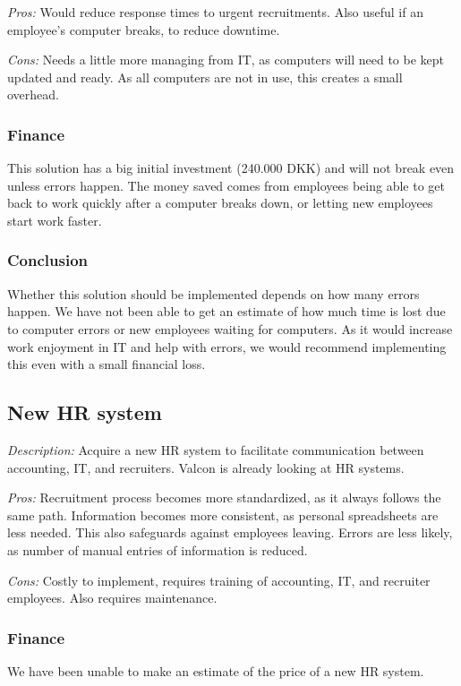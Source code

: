 \emph{Pros:} Would reduce response times to urgent recruitments.
Also useful if an employee's computer breaks, to reduce downtime.

\emph{Cons:} Needs a little more managing from IT, as
computers will need to be kept updated and ready.
As all computers are not in use, this creates a small overhead.

\subsubsection{Finance} 
This solution has a big initial investment (240.000 DKK) and will not break even unless errors happen.
The money saved comes from employees being able to get back to work quickly after a computer breaks down, or letting new employees start work faster.

\subsubsection{Conclusion}
Whether this solution should be implemented depends on how many errors happen.
We have not been able to get an estimate of how much time is lost due to computer errors or new employees waiting for computers.
As it would increase work enjoyment in IT and help with errors, we would recommend implementing this even with a small financial loss.

\subsection{New HR system}
\emph{Description:} Acquire a new HR system to facilitate communication between accounting, IT, and recruiters.
Valcon is already looking at HR systems.

\emph{Pros:} Recruitment process becomes more standardized, as it always follows the same path.
Information becomes more consistent, as personal spreadsheets are less needed. 
This also safeguards against employees leaving.
Errors are less likely, as number of manual entries of information is reduced.

\emph{Cons:} Costly to implement, requires training of accounting, IT, and recruiter employees.
Also requires maintenance.

\subsubsection{Finance}
We have been unable to make an estimate of the price of a new HR system.

